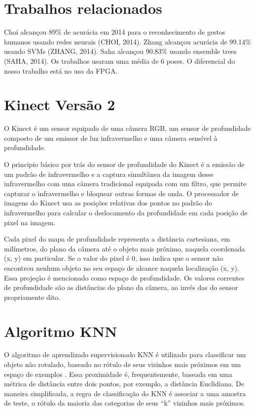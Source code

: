 \documentclass[12pt]{article}
\begin{document}
\section{Trabalhos relacionados}

Choi alcançou 89\% de acurácia em 2014 para o reconhecimento de gestos humanos usando redes neurais (CHOI, 2014). Zhang
alcançou acurácia de 99.14\% usando SVMs (ZHANG, 2014). Saha alcançou 90.83\% usando ensemble trees (SAHA, 2014). Os 
trabalhos usaram uma média de 6 poses. O diferencial do nosso trabalho está no uso da FPGA.

\section{Kinect Vers\~ao 2} \label{sec:kinectversion2}

O Kinect é um sensor equipado de uma câmera RGB, um sensor de profundidade composto de um emissor de luz infravermelho e
uma câmera sensível à profundidade.

O principio básico por trás do sensor de profundidade do Kinect é a emissão de um padrão de infravermelho e a captura
simultânea da imagem desse infravermelho com uma câmera tradicional equipada com um filtro, que permite capturar o 
infravermelho e bloquear outras formas de onda. O processador de imagens do Kinect usa as posições relativas dos pontos 
no padrão do infravermelho para calcular o deslocamento da profundidade em cada posição de pixel na imagem.

Cada pixel do mapa de profundidade representa a distância cartesiana, em milímetros, do plano da câmera até o objeto mais 
próximo, naquela coordenada (x, y) em particular. Se o valor do pixel é 0, isso indica que o sensor não encontrou nenhum
objeto no seu espaço de alcance naquela localização (x, y). Essa projeção é mencionado como espaço de profundidade. Os 
valores correntes de profundidade são as distâncias do plano da câmera, ao invés das do sensor propriamente dito.

\section{Algoritmo KNN}

O algoritmo de aprendizado supervisionado KNN é utilizado para classificar um
objeto não rotulado, baseado no rótulo de seus vizinhos mais próximos em um
espaço de exemplos \cite{Cechinel:Disertacao:2014}. Essa proximidade é, frequentemente, baseada em uma métrica
de distância entre dois pontos, por exemplo, a distância Euclidiana. De maneira
simplificada, a regra de classificação do KNN é associar a uma amostra de
teste, o rótulo da maioria das categorias de seus ``k'' vizinhos mais próximos. 
\end{document}
